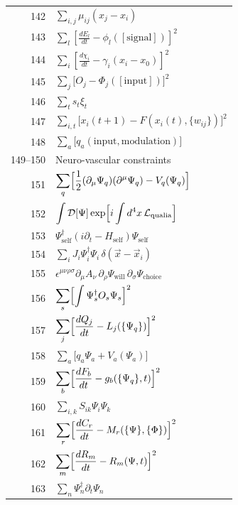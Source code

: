 \documentclass[12pt,a4paper]{article}
\begin{document}
\begin{longtable}{r p{}}
	142 & \(\displaystyle \sum_{i,j}\mu_{ij}(x_j - x_i)\) \\
	143 & \(\displaystyle \sum_l\left[\frac{dE_l}{dt} - \phi_l([\text{signal}])\right]^2\) \\
	144 & \(\displaystyle \sum_i\left[\frac{d\chi_i}{dt} - \gamma_i(x_i - x_0)\right]^2\) \\
	145 & \(\displaystyle \sum_j\bigl[O_j - \Phi_j([\text{input}])\bigr]^2\) \\
	146 & \(\displaystyle \sum_t s_t\xi_t\) \\
	147 & \(\displaystyle \sum_{i,t}\bigl[x_i(t+1) - F(x_i(t),\{w_{ij}\})\bigr]^2\) \\
	148 & \(\displaystyle \sum_a\bigl[q_a(\text{input},\text{modulation})\bigr]\) \\
	149–150 & Neuro-vascular constraints \\
	151 & \(\displaystyle \sum_q\Bigl[\frac12(\partial_\mu\Psi_q)(\partial^\mu\Psi_q) - V_q(\Psi_q)\Bigr]\) \\
	152 & \(\displaystyle \int\mathcal{D}[\Psi]\exp\Bigl[i\int d^4x\,\mathcal{L}_{\text{qualia}}\Bigr]\) \\
	153 & \(\displaystyle \Psi^\dagger_{\text{self}}(i\partial_t - H_{\text{self}})\Psi_{\text{self}}\) \\
	154 & \(\displaystyle \sum_i J_i\Psi^\dagger_i\Psi_i\,\delta(\vec x - \vec x_i)\) \\
	155 & \(\displaystyle \epsilon^{\mu\nu\rho\sigma}\partial_\mu A_\nu\,\partial_\rho\Psi_{\text{will}}\,\partial_\sigma\Psi_{\text{choice}}\) \\
	156 & \(\displaystyle \sum_s\Bigl[\int\Psi^\dagger_s O_s\Psi_s\Bigr]^2\) \\
	157 & \(\displaystyle \sum_j\Bigl[\frac{dQ_j}{dt} - L_j(\{\Psi_q\})\Bigr]^2\) \\
	158 & \(\displaystyle \sum_a\bigl[q_a\Psi_a + V_a(\Psi_a)\bigr]\) \\
	159 & \(\displaystyle \sum_b\Bigl[\frac{dF_b}{dt} - g_b(\{\Psi_q\},t)\Bigr]^2\) \\
	160 & \(\displaystyle \sum_{i,k}S_{ik}\Psi_i\Psi_k\) \\
	161 & \(\displaystyle \sum_r\Bigl[\frac{dC_r}{dt} - M_r(\{\Psi\},\{\Phi\})\Bigr]^2\) \\
	162 & \(\displaystyle \sum_m\Bigl[\frac{dR_m}{dt} - R_m(\Psi,t)\Bigr]^2\) \\
	163 & \(\displaystyle \sum_n\Psi^\dagger_n\partial_t\Psi_n\) \\

\end{longtable}
\end{document}
